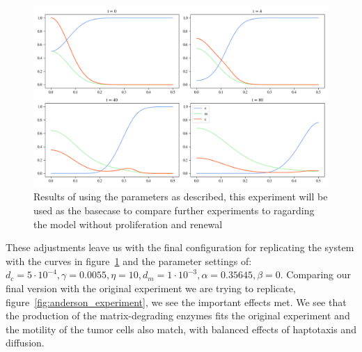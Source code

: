 \begin{figure}[h]
    \centering
    \includegraphics[width=\textwidth]{resources/images/basecase_without_proliferation_.png}
    \caption{Results of using the parameters as described, this experiment will be used as the basecase to compare further experiments to ragarding the model without proliferation and renewal}
    \label{fig:basecase_without_proliferation}
\end{figure}
These adjustments leave us with the final configuration for replicating the system with the curves in figure~\ref{fig:basecase_without_proliferation} and the parameter settings of: $d_c=5\cdot 10^{-4}, \gamma=0.0055, \eta=10, d_m=1\cdot 10^{-3}, \alpha=0.35645, \beta=0$. Comparing our final version with the original experiment we are trying to replicate, figure~\ref{fig:anderson_experiment}, we see the important effects met. We see that the production of the matrix-degrading enzymes fits the original experiment and the motility of the tumor cells also match, with balanced effects of haptotaxis and diffusion.


